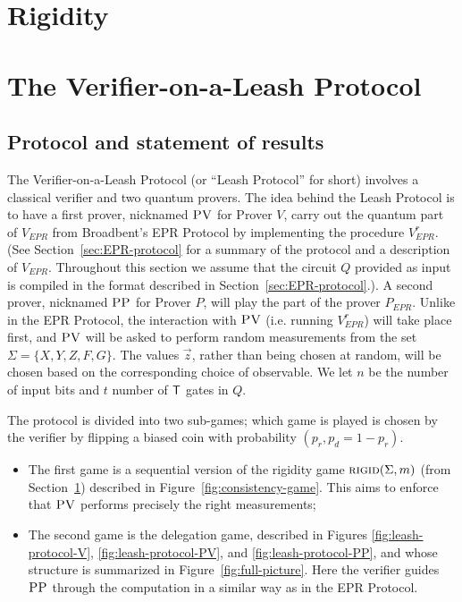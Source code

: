 \documentclass[11pt]{article}
\theoremstyle{remark}
\theoremstyle{definition}
\newcommand{\rigid}{\textsc{rigid}}
\newcommand{\pv}{\textsc{PV}}
\newcommand{\pp}{\textsc{PP}}
\begin{document}
\section{Rigidity}
\label{sec:rigidity}






\section{The Verifier-on-a-Leash Protocol}
\label{sec:leash}




\subsection{Protocol and statement of results}

The Verifier-on-a-Leash Protocol (or ``Leash Protocol'' for short) involves a classical verifier and two quantum provers.
The idea behind the Leash Protocol is to have a first prover, nicknamed $\pv$ for Prover $V$, carry out the quantum part of $V_{EPR}$ from Broadbent's EPR Protocol by implementing the procedure $V_{EPR}^r$. (See Section~\ref{sec:EPR-protocol} for a summary of the protocol and a description of $V_{EPR}$. Throughout this section we assume that the circuit $Q$ provided as input is compiled in the format described in Section~\ref{sec:EPR-protocol}.). A second prover, nicknamed $\pp$ for Prover $P$, will play the part of the prover $P_{EPR}$. Unlike in the EPR Protocol, the interaction with $\pv$ (i.e. running $V_{EPR}^r$) will take place {first}, and $\pv$ will be asked to perform {random} measurements from the set $\Sigma = \{X,Y,Z,F,G\}$. The values $\vec{z}$, rather than being chosen at random, will be chosen based on the corresponding choice of observable. We let $n$ be the number of input bits and $t$ number of $\sf T$ gates in $Q$. 

The protocol is divided into two sub-games; which game is played is chosen by the verifier by flipping a biased coin with probability $(p_r,p_d=1-p_r)$.
\begin{itemize}[nolistsep]
\item The first game is a sequential version of the rigidity game $\rigid(\Sigma,m)$ (from Section~\ref{sec:rigidity}) described in Figure~\ref{fig:consistency-game}. This aims to enforce that $\pv$ performs precisely the right measurements;

\item The second game is the delegation game, described in Figures \ref{fig:leash-protocol-V}, \ref{fig:leash-protocol-PV}, and \ref{fig:leash-protocol-PP}, and whose structure is summarized in Figure~\ref{fig:full-picture}. Here the verifier guides $\pp$ through the computation in a similar way as in the EPR Protocol.
\end{itemize}
\end{document}
